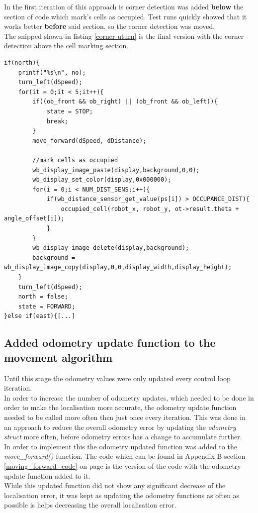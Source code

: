 In the first iteration of this approach is corner detection was added \textbf{below} the section of code which mark's cells as occupied. Test runs quickly showed that it works better \textbf{before} said section, so the corner detection was moved.\\
The snipped shown in listing \ref{corner-uturn} is the final version with the corner detection above the cell marking section.

\begin{lstlisting}[caption={Corner detection added to the U-turn routine}, label={corner-uturn}]
if(north){
    printf("%s\n", no);
    turn_left(dSpeed);
    for(it = 0;it < 5;it++){
        if((ob_front && ob_right) || (ob_front && ob_left)){
            state = STOP;
            break;
        }
        move_forward(dSpeed, dDistance);

        //mark cells as occupied
        wb_display_image_paste(display,background,0,0);
        wb_display_set_color(display,0x000000);
        for(i = 0;i < NUM_DIST_SENS;i++){
            if(wb_distance_sensor_get_value(ps[i]) > OCCUPANCE_DIST){
                occupied_cell(robot_x, robot_y, ot->result.theta + angle_offset[i]);
            }
        }
        wb_display_image_delete(display,background);
        background = wb_display_image_copy(display,0,0,display_width,display_height);
    }
    turn_left(dSpeed);
    north = false;
    state = FORWARD;
}else if(east){[...]
\end{lstlisting}

\subsection{Added odometry update function to the movement algorithm}
Until this stage the odometry values were only updated every control loop iteration. \\
In order to increase the number of odometry updates, which needed to be done in order to make the localisation more accurate, the odometry update function needed to be called more often then just once every iteration.
This was done in an approach to reduce the overall odometry error  by updating the \textit{odometry struct} more often, before odometry errors has a change to accumulate further. \\[3ex]

In order to implement this the odometry updated function was added to the \textit{move\_forward()} function.
The code which can be found in Appendix B section \ref{moving_forward_code} on page \pageref{moving_forward_code} is the version of the code with the odometry update function added to it. \\
While this updated function did not show any significant decrease of the localisation error, it was kept as updating the odometry functions as often as possible is helps decreasing the overall localisation error.

